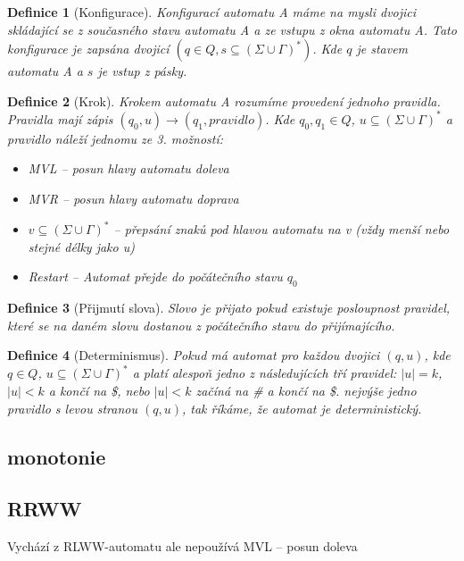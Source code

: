 \documentclass{article}
\newtheorem{definition}{Definice}
\begin{document}
\begin{definition}[Konfigurace]
	Konfigurací automatu A máme na mysli dvojici skládající se z současného stavu automatu A a ze vstupu z okna automatu A.
	Tato konfigurace je zapsána dvojicí $(q \in Q, s \subseteq (\Sigma \cup \Gamma)^* )$.
	Kde $q$ je stavem automatu A a $s$ je vstup z pásky.
\end{definition}

\begin{definition}[Krok]
	Krokem automatu A rozumíme provedení jednoho pravidla.
	Pravidla mají zápis $(q_0, u) \to (q_1, pravidlo)$.
	Kde $q_0, q_1 \in Q$, $u \subseteq (\Sigma \cup \Gamma)^*$ a pravidlo náleží jednomu ze 3. možností:
	\begin{itemize}
		\item MVL -- posun hlavy automatu doleva
		\item MVR -- posun hlavy automatu doprava
		\item $v \subseteq (\Sigma \cup \Gamma)^*$
		-- přepsání znaků pod hlavou automatu na v (vždy menší nebo stejné délky jako u)
		\item Restart -- Automat přejde do počátečního stavu $q_0$
	\end{itemize}
\end{definition}

\begin{definition}[Přijmutí slova]
	Slovo je přijato pokud existuje posloupnost pravidel, které se na daném slovu dostanou z počátečního stavu do přijímajícího.


\end{definition}


\begin{definition}[Determinismus]
Pokud má automat pro každou dvojici $(q, u)$, kde $q \in Q$, $u \subseteq (\Sigma \cup \Gamma)^*$ a platí alespoň jedno z následujících tří pravidel:
$|u| = k$, $|u| < k$ a končí na \$, nebo $|u| < k$ začíná na \# a končí na \$.
nejvýše jedno pravidlo s levou stranou $(q, u)$, tak říkáme, že automat je deterministický.
\end{definition}

\subsection{monotonie}

\subsection{RRWW}
Vychází z RLWW-automatu ale nepoužívá MVL -- posun doleva
\end{document}
